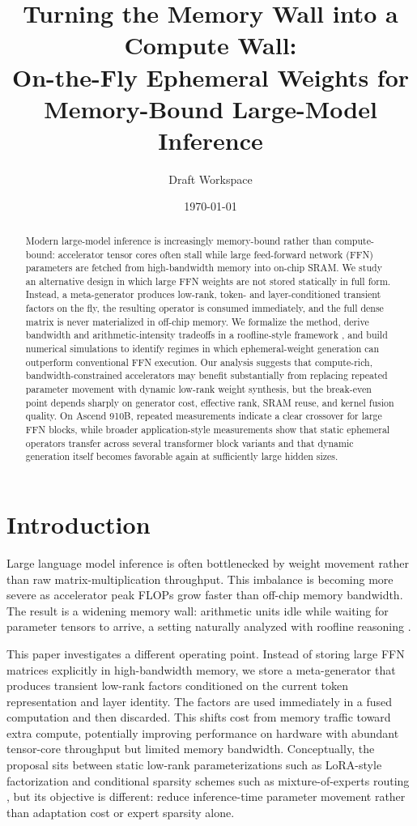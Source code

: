 \documentclass[11pt]{article}
\title{Turning the Memory Wall into a Compute Wall:\\On-the-Fly Ephemeral Weights for Memory-Bound Large-Model Inference}
\author{Draft Workspace}
\date{\today}
\begin{document}
\maketitle

\begin{abstract}
Modern large-model inference is increasingly memory-bound rather than compute-bound: accelerator tensor cores often stall while large feed-forward network (FFN) parameters are fetched from high-bandwidth memory into on-chip SRAM. We study an alternative design in which large FFN weights are not stored statically in full form. Instead, a meta-generator produces low-rank, token- and layer-conditioned transient factors on the fly, the resulting operator is consumed immediately, and the full dense matrix is never materialized in off-chip memory. We formalize the method, derive bandwidth and arithmetic-intensity tradeoffs in a roofline-style framework \cite{williams2009roofline}, and build numerical simulations to identify regimes in which ephemeral-weight generation can outperform conventional FFN execution. Our analysis suggests that compute-rich, bandwidth-constrained accelerators may benefit substantially from replacing repeated parameter movement with dynamic low-rank weight synthesis, but the break-even point depends sharply on generator cost, effective rank, SRAM reuse, and kernel fusion quality. On Ascend 910B, repeated measurements indicate a clear crossover for large FFN blocks, while broader application-style measurements show that static ephemeral operators transfer across several transformer block variants and that dynamic generation itself becomes favorable again at sufficiently large hidden sizes.
\end{abstract}

\section{Introduction}
Large language model inference is often bottlenecked by weight movement rather than raw matrix-multiplication throughput. This imbalance is becoming more severe as accelerator peak FLOPs grow faster than off-chip memory bandwidth. The result is a widening memory wall: arithmetic units idle while waiting for parameter tensors to arrive, a setting naturally analyzed with roofline reasoning \cite{williams2009roofline}.

This paper investigates a different operating point. Instead of storing large FFN matrices explicitly in high-bandwidth memory, we store a meta-generator that produces transient low-rank factors conditioned on the current token representation and layer identity. The factors are used immediately in a fused computation and then discarded. This shifts cost from memory traffic toward extra compute, potentially improving performance on hardware with abundant tensor-core throughput but limited memory bandwidth. Conceptually, the proposal sits between static low-rank parameterizations such as LoRA-style factorization \cite{hu2021lora} and conditional sparsity schemes such as mixture-of-experts routing \cite{shazeer2017outrageously,fedus2022switch}, but its objective is different: reduce inference-time parameter movement rather than adaptation cost or expert sparsity alone.
\end{document}
